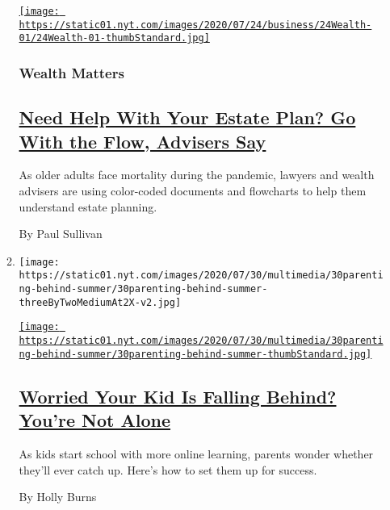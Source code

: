 \begin{enumerate}
\begin{enumerate}
    \href{/2020/07/24/your-money/need-help-with-your-estate-plan-go-with-the-flow-advisers-say.html}{\texttt{[image: https://static01.nyt.com/images/2020/07/24/business/24Wealth-01/24Wealth-01-thumbStandard.jpg]}}

    \hypertarget{wealth-matters}{%
    \subsubsection{Wealth Matters}\label{wealth-matters}}

    \hypertarget{need-help-with-your-estate-plan-go-with-the-flow-advisers-say}{%
    \subsection{\texorpdfstring{\href{/2020/07/24/your-money/need-help-with-your-estate-plan-go-with-the-flow-advisers-say.html}{Need
    Help With Your Estate Plan? Go With the Flow, Advisers
    Say}}{Need Help With Your Estate Plan? Go With the Flow, Advisers Say}}\label{need-help-with-your-estate-plan-go-with-the-flow-advisers-say}}

    As older adults face mortality during the pandemic, lawyers and
    wealth advisers are using color-coded documents and flowcharts to
    help them understand estate planning.

    By Paul Sullivan
  \item
    \texttt{[image: https://static01.nyt.com/images/2020/07/30/multimedia/30parenting-behind-summer/30parenting-behind-summer-threeByTwoMediumAt2X-v2.jpg]}

    \href{/2020/07/30/parenting/online-learning-school-coronavirus.html}{\texttt{[image: https://static01.nyt.com/images/2020/07/30/multimedia/30parenting-behind-summer/30parenting-behind-summer-thumbStandard.jpg]}}

    \hypertarget{worried-your-kid-is-falling-behind-youre-not-alone}{%
    \subsection{\texorpdfstring{\href{/2020/07/30/parenting/online-learning-school-coronavirus.html}{Worried
    Your Kid Is Falling Behind? You're Not
    Alone}}{Worried Your Kid Is Falling Behind? You're Not Alone}}\label{worried-your-kid-is-falling-behind-youre-not-alone}}

    As kids start school with more online learning, parents wonder
    whether they'll ever catch up. Here's how to set them up for
    success.

    By Holly Burns
  \end{enumerate}
\end{enumerate}

